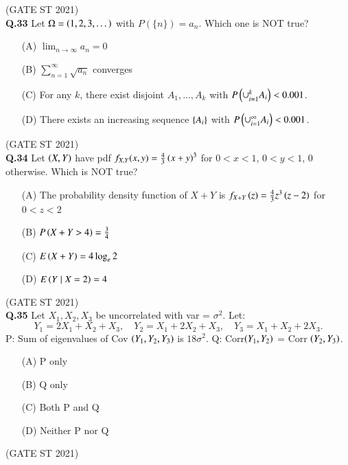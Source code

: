 \documentclass[journal,12pt,onecolumn]{IEEEtran}
\theoremstyle{remark}
\begin{document}
\hfill (GATE ST 2021) \\
\textbf{Q.33}
Let $\Omega = \left(1,2,3,\dots\right)$ with $P(\{n\}) = a_n$. Which one is NOT true?
\begin{enumerate}
\item[(A)] $\lim_{n\to\infty} a_n = 0$
\item[(B)] $\sum_{n=1}^\infty \sqrt{a_n}$ converges
\item[(C)] For any $k$, there exist disjoint $A_1, \dots, A_k$ with $P\left(\cup_{i=1}^k A_i\right) < 0.001$.
\item[(D)] There exists an increasing sequence $\left\{A_i\right\}$ with $P\left(\cup_{i=1}^\infty A_i\right) < 0.001$.
\end{enumerate}

\hfill (GATE ST 2021) \\
\textbf{Q.34}
Let $\left(X,Y\right)$ have pdf $f_{X,Y}(x,y) = \frac{4}{3}\left(x+y\right)^3$ for $0 < x < 1$, $0 < y < 1$, $0$ otherwise. Which is NOT true?
\begin{enumerate}
\item[(A)] The probability density function of $X+Y$ is $f_{X+Y}\left(z\right) = \frac{4}{3} z^3 \left(z-2\right)$ for $0<z<2$
\item[(B)] $P\left(X+Y > 4\right) = \frac{3}{4}$
\item[(C)] $E\left(X+Y\right) = 4 \log_e 2$
\item[(D)] $E\left(Y \mid X=2\right) = 4$
\end{enumerate}

\hfill (GATE ST 2021) \\
\textbf{Q.35}
Let $X_1, X_2, X_3$ be uncorrelated with var = $\sigma^2$. Let:
\[
Y_1 = 2X_1 + X_2 + X_3,\quad Y_2 = X_1 + 2X_2 + X_3,\quad Y_3 = X_1 + X_2 + 2X_3.
\]
P: Sum of eigenvalues of Cov $\left(Y_1,Y_2,Y_3\right)$ is $18\sigma^2$.  
Q: Corr$\left(Y_1,Y_2\right)$ = Corr $\left(Y_2,Y_3\right)$.
\begin{enumerate}
\item[(A)] P only
\item[(B)] Q only
\item[(C)] Both P and Q
\item[(D)] Neither P nor Q
\end{enumerate}

\hfill (GATE ST 2021) \\
\end{document}

